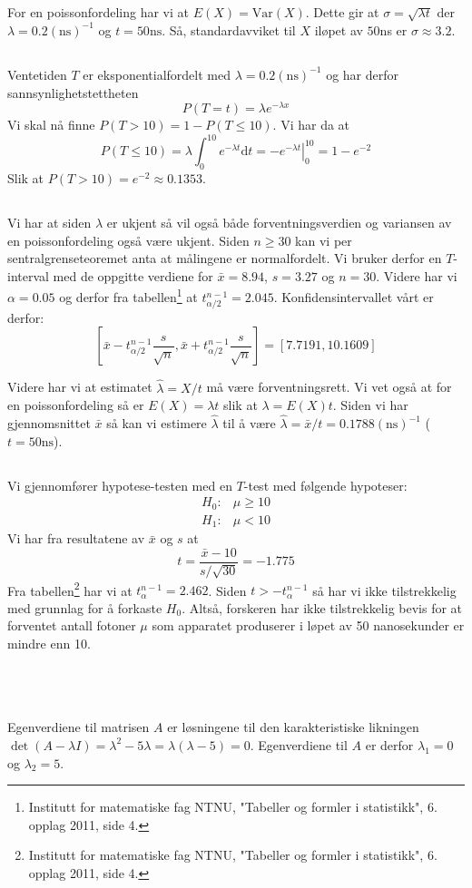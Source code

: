 \documentclass[12pt, a4paper,norsk]{article}
\newcommand{\oppgave}{\,\section{}}
\newcommand{\deloppgave}{\subsection{}}
\newcommand{\confidence}[3]{\left[#1 - #2_{\alpha/2} #3, #1 + #2_{\alpha/2} #3\right]}
\newcommand{\prob}[1]{P\left(#1\right)}
\newcommand{\var}[1]{\mathrm{Var}\left(#1\right)}
\newcommand{\expected}[1]{E\left(#1\right)}
\newcommand{\score}[3]{\frac{#1 - #2}{#3}}
\newcommand{\dd}{\mathrm{d}}
\newcommand{\inverse}{^{-1}}
\newcommand{\tabell}[1]{\footnote{
	Institutt for matematiske fag NTNU,
	"Tabeller og formler i statistikk", 
	6. opplag 2011, side #1.}}
\begin{document}
	\deloppgave
	For en poissonfordeling har vi at $\expected{X} = \var{X}$. Dette gir at $\sigma = \sqrt{\lambda t}$ der $\lambda = 0.2(\text{ns})\inverse$ og $t = 50\text{ns}$. Så, standardavviket til $X$ iløpet av $50$ns er $\sigma \approx 3.2$.
	
	\deloppgave
	Ventetiden $T$ er eksponentialfordelt med $\lambda = 0.2(\text{ns})\inverse$ og har derfor sannsynlighetstettheten
	$$
	\prob{T = t} = \lambda e^{-\lambda x}
	$$
	Vi skal nå finne $\prob{T > 10} = 1 - \prob{T \leq 10}$. Vi har da at
	$$
	\prob{T \leq 10} = \lambda\int_{0}^{10} e^{-\lambda t} \dd t= \left. -e^{-\lambda t}\right|_{0}^{10} = 1 - e^{-2}
	$$
	Slik at $\prob{T > 10} = e^{-2} \approx 0.1353$.
	
	\deloppgave
	Vi har at siden $\lambda$ er ukjent så vil også både forventningsverdien og variansen av en poissonfordeling også være ukjent. Siden $n \geq 30$ kan vi per sentralgrenseteoremet anta at målingene er normalfordelt. Vi bruker derfor en $T$-interval med de oppgitte verdiene for $\bar{x} = 8.94$, $s = 3.27$ og $n = 30$. Videre har vi $\alpha = 0.05$ og derfor fra tabellen\tabell{4} at $t_{\alpha/2}^{n-1} = 2.045$. Konfidensintervallet vårt er derfor:
	$$
	\confidence{\bar{x}}{t^{n-1}}{\frac{s}{\sqrt{n}}} = [7.7191, 10.1609]
	$$
	
	Videre har vi at estimatet $\hat{\lambda} = X/t$ må være forventningsrett. Vi vet også at for en poissonfordeling så er $\expected{X} = \lambda t$ slik at $\lambda = \expected{X}{t}$. Siden vi har gjennomsnittet $\bar{x}$ så kan vi estimere $\hat{\lambda}$ til å være $\hat{\lambda} = \bar{x}/t = 0.1788(\text{ns})\inverse$ ($t = 50\text{ns}$).
	\clearpage
	\deloppgave
	Vi gjennomfører hypotese-testen med en $T$-test med følgende hypoteser:
	\begin{align}
		H_0\colon & \mu \geq 10\\
		H_1\colon & \mu < 10
	\end{align}
	Vi har fra resultatene av $\bar{x}$ og $s$ at 
	$$
	t = \score{\bar{x}}{10}{s/\sqrt{30}} = -1.775
	$$
	Fra tabellen\tabell{4} har vi at $t_{\alpha}^{n-1} = 2.462$. Siden $t > -t_{\alpha}^{n-1}$ så har vi ikke tilstrekkelig med grunnlag for å forkaste $H_0$. Altså, forskeren har ikke tilstrekkelig bevis for at  forventet antall fotoner $\mu$ som apparatet produserer i løpet av 50
	nanosekunder er mindre enn 10.
	
	\oppgave
	\deloppgave
	Egenverdiene til matrisen $A$ er løsningene til den karakteristiske likningen $\det(A - \lambda I) = \lambda^2 - 5\lambda = \lambda(\lambda - 5) = 0$. Egenverdiene til $A$ er derfor $\lambda_1 = 0$ og $\lambda_2 = 5$. 
	
\end{document}

